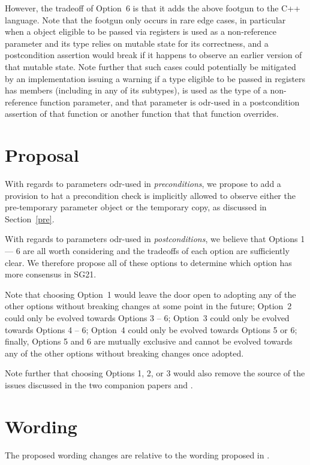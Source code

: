 However, the tradeoff of Option~6 is that it adds the above footgun to the C++ language. Note that the footgun only occurs in rare edge cases, in particular when a  object eligible to be passed via registers is used as a non-reference parameter and its type relies on mutable state for its correctness, and a postcondition assertion would break if it happens to observe an earlier version of that mutable state. Note further that such cases could potentially be mitigated by an implementation issuing a warning if a type eligible to be passed in registers has  members (including in any of its subtypes), is used as the type of a non-reference function parameter, and that parameter is odr-used in a postcondition assertion of that function or another function that that function overrides.

\section{Proposal}

With regards to parameters odr-used in \emph{preconditions}, we propose to add a provision to \cite{P2900R10} hat a precondition check is implicitly allowed to observe either the pre-temporary parameter object or the temporary copy, as discussed in Section~\ref{pre}.

With regards to parameters odr-used in \emph{postconditions}, we believe that Options 1 --- 6 are all worth considering and the tradeoffs of each option are sufficiently clear. We therefore propose all of these options to determine which option has more consensus in SG21. 

Note that choosing Option~1 would leave the door open to adopting any of the other options without breaking changes at some point in the future; Option~2 could only be evolved towards Options 3 -- 6; Option~3 could only be evolved towards Options 4 -- 6; Option~4 could only be evolved towards Options 5 or 6; finally, Options 5 and 6 are mutually exclusive and cannot be evolved towards any of the other options without breaking changes once adopted.

Note further that choosing Options 1, 2, or 3 would also remove the source of the issues discussed in the two companion papers \cite{D3484R1} and \cite{D3489R0}.
\section{Wording}

The proposed wording changes are relative to the wording proposed in \cite{P2900R10}.

